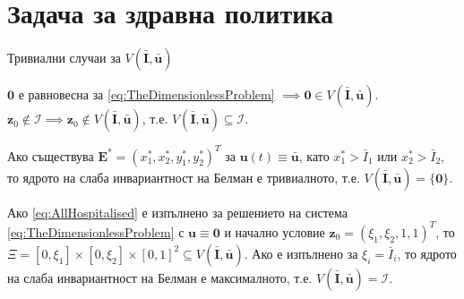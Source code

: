 \section{\hspace{1em}Задача за здравна политика}

\begin{frame}[t]{Тривиални случаи за $V(\bar{\boldsymbol{I}}, \bar{\boldsymbol{u}})$}
  
  $\pmb{0}$ е равновесна за \eqref{eq:TheDimensionlessProblem} $\implies \pmb{0} \in V(\bar{\boldsymbol{I}}, \bar{\boldsymbol{u}})$. \\
  $\boldsymbol{z}_0 \notin \mathscr{I} \implies \boldsymbol{z}_0 \notin V(\bar{\boldsymbol{I}}, \bar{\boldsymbol{u}})$, т.е. $V(\bar{\boldsymbol{I}}, \bar{\boldsymbol{u}}) \subseteq \mathscr{I}$.
  
  \begin{proposition}
    Ако съществува $\boldsymbol{E}^* = (x_1^*, x_2^*, y_1^*, y_2^*)^T$ за $\boldsymbol{u}(t) \equiv \bar{\boldsymbol{u}}$, като $x_1^* > \bar{I}_1$ или $x_2^* > \bar{I}_2$, то ядрото на слаба инвариантност на Белман е тривиалното, т.е. $V(\bar{\boldsymbol{I}}, \bar{\boldsymbol{u}}) = \{\pmb{0}\}$.
  \end{proposition}


  \begin{proposition}
    Ако \eqref{eq:AllHospitalised} е изпълнено за решението на система \eqref{eq:TheDimensionlessProblem} с $\boldsymbol{u} \equiv \pmb{0}$ и начално условие $\boldsymbol{z}_0 = (\xi_1, \xi_2, 1, 1)^T$, то $\Xi = [0, \xi_1] \times [0, \xi_2] \times [0, 1]^2 \subseteq V(\bar{\boldsymbol{I}}, \bar{\boldsymbol{u}})$.
    Ако е изпълнено за $\xi_i = \bar{I}_i$, то ядрото на слаба инвариантност на Белман е максималното, т.е. $V(\bar{\boldsymbol{I}}, \bar{\boldsymbol{u}}) = \mathscr{I}$.
  \end{proposition}

\end{frame}


